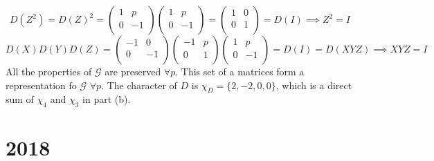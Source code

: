 \documentclass[a4paper]{article}
\begin{document}
\begin{ans}
\begin{enumerate}[label=(\alph*)]
$$D(Z^2)=D(Z)^2=\begin{pmatrix}1&p\\0&-1\\\end{pmatrix}\begin{pmatrix}1&p\\0&-1\\\end{pmatrix}=\begin{pmatrix}1&0\\0&1\\\end{pmatrix}=D(I)\implies Z^2=I$$
$$D(X)D(Y)D(Z)=\begin{pmatrix}-1&0\\0&-1\\\end{pmatrix}\begin{pmatrix}-1&p\\0&1\\\end{pmatrix}\begin{pmatrix}1&p\\0&-1\\\end{pmatrix}=D(I)=D(XYZ)\implies XYZ=I$$
All the properties of $\mathcal{G}$ are preserved $\forall p$. This set of a matrices form a representation fo $\mathcal{G}$ $\forall p$. The character of $D$ is $\chi_D=\{2,-2,0,0\}$, which is a direct sum of $\chi_4$ and $\chi_3$ in part (b).
\end{enumerate}
\end{ans}
\newpage
\section{2018}
\end{document}
